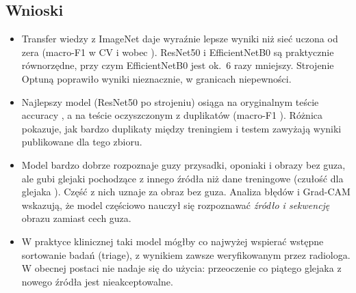 \subsection*{Wnioski}
\begin{itemize}
\item Transfer wiedzy z ImageNet daje wyraźnie lepsze wyniki niż sieć uczona od zera
  (macro-F1 w CV \cvFRes{} i \cvFEff{} wobec \cvFCnn{}). ResNet50 i EfficientNetB0 są
  praktycznie równorzędne, przy czym EfficientNetB0 jest ok.~6 razy mniejszy. Strojenie
  Optuną poprawiło wyniki nieznacznie, w granicach niepewności.
\item Najlepszy model (ResNet50 po strojeniu) osiąga na oryginalnym teście accuracy
  \accTestResTuned{}, a na teście oczyszczonym z duplikatów \accDedupResTuned{}
  (macro-F1 \fDedupResTuned{}). Różnica pokazuje, jak bardzo duplikaty między treningiem
  i testem zawyżają wyniki publikowane dla tego zbioru.
\item Model bardzo dobrze rozpoznaje guzy przysadki, oponiaki i obrazy bez guza, ale gubi
  glejaki pochodzące z innego źródła niż dane treningowe (czułość dla glejaka
  \sensDedupGlioma{}). Część z nich uznaje za obraz bez guza. Analiza błędów i Grad-CAM
  wskazują, że model częściowo nauczył się rozpoznawać \emph{źródło i sekwencję} obrazu
  zamiast cech guza.
\item W praktyce klinicznej taki model mógłby co najwyżej wspierać wstępne sortowanie badań
  (triage), z wynikiem zawsze weryfikowanym przez radiologa. W obecnej postaci nie nadaje się
  do użycia: przeoczenie co piątego glejaka z nowego źródła jest nieakceptowalne.
\end{itemize}

